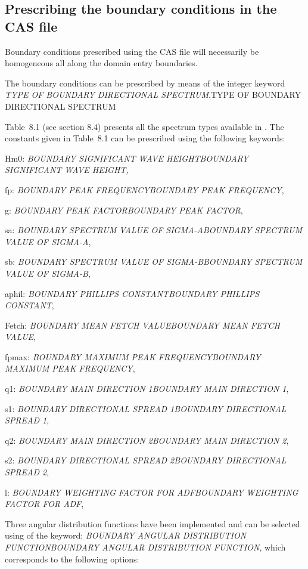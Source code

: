 \subsection{ Prescribing the boundary conditions in the CAS file}

 Boundary conditions prescribed using the CAS file will necessarily be homogeneous all along the domain entry boundaries.

 The boundary conditions can be prescribed by means of the integer keyword \textit{TYPE OF BOUNDARY DIRECTIONAL SPECTRUM}.TYPE OF BOUNDARY DIRECTIONAL SPECTRUM

 Table~8.1 (see section 8.4) presents all the spectrum types available in \tomawac. The constants given in Table~8.1 can be prescribed using the following keywords:

 Hm0:  \textit{BOUNDARY SIGNIFICANT WAVE HEIGHTBOUNDARY SIGNIFICANT WAVE HEIGHT,}

 fp:  \textit{BOUNDARY PEAK FREQUENCYBOUNDARY PEAK FREQUENCY},

 g:  \textit{BOUNDARY PEAK FACTORBOUNDARY PEAK FACTOR},

 sa:  \textit{BOUNDARY SPECTRUM VALUE OF SIGMA-ABOUNDARY SPECTRUM VALUE OF SIGMA-A},

 sb:  \textit{BOUNDARY SPECTRUM VALUE OF SIGMA-BBOUNDARY SPECTRUM VALUE OF SIGMA-B},

 aphil:  \textit{BOUNDARY PHILLIPS CONSTANTBOUNDARY PHILLIPS CONSTANT},

 Fetch:  \textit{BOUNDARY MEAN FETCH VALUEBOUNDARY MEAN FETCH VALUE},

 fpmax:  \textit{BOUNDARY MAXIMUM PEAK FREQUENCYBOUNDARY MAXIMUM PEAK FREQUENCY},

 q1:  \textit{BOUNDARY MAIN DIRECTION 1BOUNDARY MAIN DIRECTION 1},

 s1:  \textit{BOUNDARY DIRECTIONAL SPREAD 1BOUNDARY DIRECTIONAL SPREAD 1},

 q2:  \textit{BOUNDARY MAIN DIRECTION 2BOUNDARY MAIN DIRECTION 2},

 s2:  \textit{BOUNDARY DIRECTIONAL SPREAD 2BOUNDARY DIRECTIONAL SPREAD 2},

 l:  \textit{BOUNDARY WEIGHTING FACTOR FOR ADFBOUNDARY WEIGHTING FACTOR FOR ADF},

 Three angular distribution functions have been implemented and can be selected using of the keyword: \textit{BOUNDARY ANGULAR DISTRIBUTION FUNCTIONBOUNDARY ANGULAR DISTRIBUTION FUNCTION}, which corresponds to the following options:

